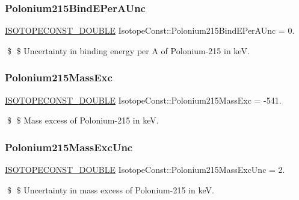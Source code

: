 \subsubsection{\texorpdfstring{Polonium215\+Bind\+E\+Per\+A\+Unc}{Polonium215BindEPerAUnc}}
{\footnotesize\ttfamily \mbox{\hyperlink{group___isotope_const-_macros_ga8f45a7272ce02c0b4c65c44636ed719a}{I\+S\+O\+T\+O\+P\+E\+C\+O\+N\+S\+T\+\_\+\+D\+O\+U\+B\+LE}} Isotope\+Const\+::\+Polonium215\+Bind\+E\+Per\+A\+Unc = 0.}

\$ \$ Uncertainty in binding energy per A of Polonium-\/215 in keV. \mbox{\label{group___isotope_const-_polonium-_po215_gaed091a2354e353f1c783616b880255a2}} 
\subsubsection{\texorpdfstring{Polonium215\+Mass\+Exc}{Polonium215MassExc}}
{\footnotesize\ttfamily \mbox{\hyperlink{group___isotope_const-_macros_ga8f45a7272ce02c0b4c65c44636ed719a}{I\+S\+O\+T\+O\+P\+E\+C\+O\+N\+S\+T\+\_\+\+D\+O\+U\+B\+LE}} Isotope\+Const\+::\+Polonium215\+Mass\+Exc = -\/541.}

\$ \$ Mass excess of Polonium-\/215 in keV. \mbox{\label{group___isotope_const-_polonium-_po215_gad66c4a731720a557ffd7d520d99a7b70}} 
\subsubsection{\texorpdfstring{Polonium215\+Mass\+Exc\+Unc}{Polonium215MassExcUnc}}
{\footnotesize\ttfamily \mbox{\hyperlink{group___isotope_const-_macros_ga8f45a7272ce02c0b4c65c44636ed719a}{I\+S\+O\+T\+O\+P\+E\+C\+O\+N\+S\+T\+\_\+\+D\+O\+U\+B\+LE}} Isotope\+Const\+::\+Polonium215\+Mass\+Exc\+Unc = 2.}

\$ \$ Uncertainty in mass excess of Polonium-\/215 in keV. \mbox{\label{group___isotope_const-_polonium-_po215_ga400a464083b4eb36b0cd54076ccd2268}} 
